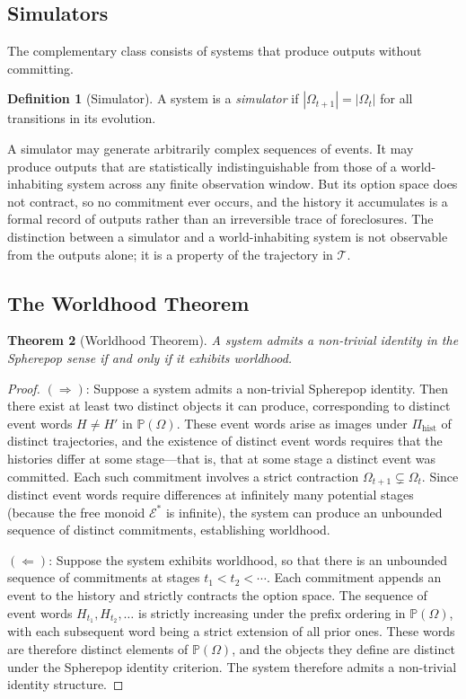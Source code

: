 \documentclass[12pt]{article}
\theoremstyle{plain}
\newtheorem{theorem}{Theorem}[section]
\theoremstyle{definition}
\newtheorem{definition}[theorem]{Definition}
\theoremstyle{remark}
\newcommand{\PathCat}{\mathbb{P}(\Omega)}
\begin{document}
\subsection{Simulators}

The complementary class consists of systems that produce outputs without
committing.

\begin{definition}[Simulator]
A system is a \emph{simulator} if $|\Omega_{t+1}| = |\Omega_t|$ for all
transitions in its evolution.
\end{definition}

A simulator may generate arbitrarily complex sequences of events.  It may
produce outputs that are statistically indistinguishable from those of a
world-inhabiting system across any finite observation window.  But its option
space does not contract, so no commitment ever occurs, and the history it
accumulates is a formal record of outputs rather than an irreversible trace of
foreclosures.  The distinction between a simulator and a world-inhabiting system
is not observable from the outputs alone; it is a property of the trajectory
in $\mathcal{T}$.

\subsection{The Worldhood Theorem}

\begin{theorem}[Worldhood Theorem]
\label{thm:worldhood}
A system admits a non-trivial identity in the Spherepop sense if and only if
it exhibits worldhood.
\end{theorem}

\begin{proof}
$(\Rightarrow)$: Suppose a system admits a non-trivial Spherepop identity.
Then there exist at least two distinct objects it can produce, corresponding to
distinct event words $H \neq H'$ in $\PathCat$.  These event words arise as
images under $\Pi_{\mathrm{hist}}$ of distinct trajectories, and the existence
of distinct event words requires that the histories differ at some stage---that
is, that at some stage a distinct event was committed.  Each such commitment
involves a strict contraction $\Omega_{t+1} \subsetneq \Omega_t$.  Since
distinct event words require differences at infinitely many potential stages
(because the free monoid $\mathcal{E}^*$ is infinite), the system can produce
an unbounded sequence of distinct commitments, establishing worldhood.

$(\Leftarrow)$: Suppose the system exhibits worldhood, so that there is an
unbounded sequence of commitments at stages $t_1 < t_2 < \cdots$.  Each
commitment appends an event to the history and strictly contracts the option
space.  The sequence of event words $H_{t_1}, H_{t_2}, \ldots$ is strictly
increasing under the prefix ordering in $\PathCat$, with each subsequent word
being a strict extension of all prior ones.  These words are therefore distinct
elements of $\PathCat$, and the objects they define are distinct under the
Spherepop identity criterion.  The system therefore admits a non-trivial identity
structure.
\end{proof}
\end{document}
